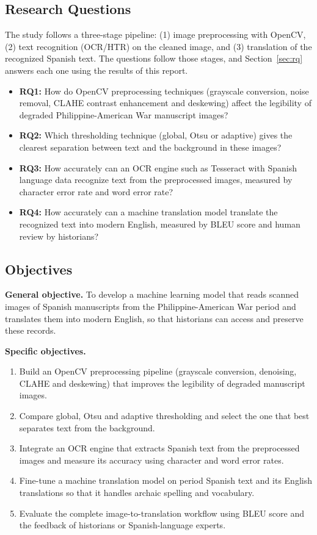 \documentclass[10pt,twocolumn]{article}
\begin{document}
\subsection{Research Questions}
The study follows a three-stage pipeline: (1) image preprocessing with OpenCV, (2) text recognition (OCR/HTR) on the cleaned image, and (3) translation of the recognized Spanish text. The questions follow those stages, and Section~\ref{sec:rq} answers each one using the results of this report.
\begin{itemize}
  \item \textbf{RQ1:} How do OpenCV preprocessing techniques (grayscale conversion, noise removal, CLAHE contrast enhancement and deskewing) affect the legibility of degraded Philippine-American War manuscript images?
  \item \textbf{RQ2:} Which thresholding technique (global, Otsu or adaptive) gives the clearest separation between text and the background in these images?
  \item \textbf{RQ3:} How accurately can an OCR engine such as Tesseract with Spanish language data recognize text from the preprocessed images, measured by character error rate and word error rate?
  \item \textbf{RQ4:} How accurately can a machine translation model translate the recognized text into modern English, measured by BLEU score and human review by historians?
\end{itemize}

\subsection{Objectives}
\textbf{General objective.} To develop a machine learning model that reads scanned images of Spanish manuscripts from the Philippine-American War period and translates them into modern English, so that historians can access and preserve these records.

\textbf{Specific objectives.}
\begin{enumerate}
  \item Build an OpenCV preprocessing pipeline (grayscale conversion, denoising, CLAHE and deskewing) that improves the legibility of degraded manuscript images.
  \item Compare global, Otsu and adaptive thresholding and select the one that best separates text from the background.
  \item Integrate an OCR engine that extracts Spanish text from the preprocessed images and measure its accuracy using character and word error rates.
  \item Fine-tune a machine translation model on period Spanish text and its English translations so that it handles archaic spelling and vocabulary.
  \item Evaluate the complete image-to-translation workflow using BLEU score and the feedback of historians or Spanish-language experts.
\end{enumerate}
\end{document}
